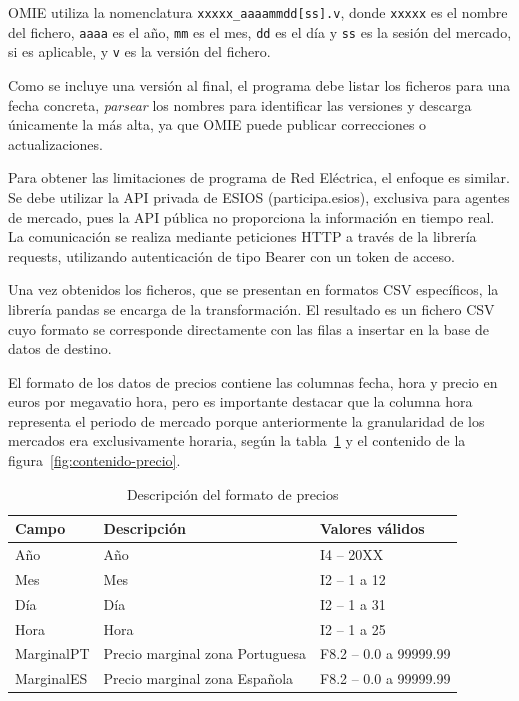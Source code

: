 OMIE utiliza la nomenclatura \texttt{xxxxx\_aaaammdd[ss].v}, donde \texttt{xxxxx} es el nombre del fichero, \texttt{aaaa} es el año, \texttt{mm} es el mes, \texttt{dd} es el día y \texttt{ss} es la sesión del mercado, si es aplicable, y \texttt{v} es la versión del fichero.

Como se incluye una versión al final, el programa debe listar los ficheros para una fecha concreta, \textit{parsear} los nombres para identificar las versiones y descarga únicamente la más alta, ya que OMIE puede publicar correcciones o actualizaciones.

Para obtener las limitaciones de programa de Red Eléctrica, el enfoque es similar. Se debe utilizar la API privada de ESIOS (participa.esios), exclusiva para agentes de mercado, pues la API pública no proporciona la información en tiempo real. La comunicación se realiza mediante peticiones HTTP a través de la librería requests, utilizando autenticación de tipo Bearer con un token de acceso.

Una vez obtenidos los ficheros, que se presentan en formatos CSV específicos, la librería pandas se encarga de la transformación. El resultado es un fichero CSV cuyo formato se corresponde directamente con las filas a insertar en la base de datos de destino.

El formato de los datos de precios contiene las columnas fecha, hora y precio en euros por megavatio hora, pero es importante destacar que la columna hora representa el periodo de mercado porque anteriormente la granularidad de los mercados era exclusivamente horaria, según la tabla~\ref{tab:descripción-precio} y el contenido de la figura~\ref{fig:contenido-precio}.

\begin{table}[ht]
  \centering
  \begin{tabular}{|l|p{7.5cm}|l|}
    \hline
    Campo & Descripción & Valores válidos\\
    \hline
    Año & Año & I4 -- 20XX\\
    Mes & Mes & I2 -- 1 a 12\\
    Día & Día & I2 -- 1 a 31\\
    Hora & Hora & I2 -- 1 a 25\\
    MarginalPT & Precio marginal zona Portuguesa & F8.2 -- 0.0 a 99999.99\\
    MarginalES & Precio marginal zona Española & F8.2 -- 0.0 a 99999.99\\
    \hline
  \end{tabular}
  \caption{Descripción del formato de precios}
  \label{tab:descripción-precio}
\end{table}

